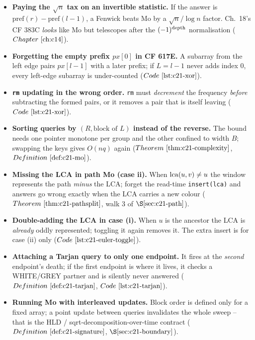 \begin{itemize}[nosep, leftmargin=1.4em]
  \item \textbf{Paying the \(\sqrt n\) tax on an invertible statistic.} If the
        answer is \(\mathrm{pref}(r)-\mathrm{pref}(l-1)\), a Fenwick beats Mo by a
        \(\sqrt n/\log n\) factor.  Ch.~18's CF 383C \emph{looks} like Mo but telescopes
        after the \((-1)^{\operatorname{depth}}\) normalisation (\(\chref{c14}\)).
  \item \textbf{Forgetting the empty prefix \(px[0]\) in CF 617E.} A subarray from
        the left edge pairs \(px[l-1]\) with a later prefix; if \(L=l-1\) never
        adds index \(0\), every left-edge subarray is under-counted
        (\(\coderef{c21-xor}\)).
  \item \textbf{\texttt{rm} updating in the wrong order.} \texttt{rm} must
        \emph{decrement} the frequency \emph{before} subtracting the formed pairs,
        or it removes a pair that is itself leaving (\(\coderef{c21-xor}\)).
  \item \textbf{Sorting queries by \((R,\text{block of }L)\) instead of the reverse.}
        The bound needs one pointer monotone per group and the other confined to
        width \(B\); swapping the keys gives \(O(nq)\) again
        (\(\thmref{c21-complexity}\), \(\defref{c21-mo}\)).
  \item \textbf{Missing the LCA in path Mo (case ii).} When \(\operatorname{lca}(u,v)\neq u\)
        the window represents the path \emph{minus} the LCA; forget the read-time
        \texttt{insert(lca)} and answers go wrong exactly when the LCA carries a
        new colour (\(\thmref{c21-pathsplit}\), walk 3 of \(\secref{c21-path}\)).
  \item \textbf{Double-adding the LCA in case (i).} When \(u\) is the ancestor the
        LCA is \emph{already} oddly represented; toggling it again removes it.
        The extra insert is for case (ii) only (\(\coderef{c21-euler-toggle}\)).
  \item \textbf{Attaching a Tarjan query to only one endpoint.} It fires at the
        \emph{second} endpoint's death; if the first endpoint is where it lives, it
        checks a WHITE/GREY partner and is silently never answered
        (\(\defref{c21-tarjan}\), \(\coderef{c21-tarjan}\)).
  \item \textbf{Running Mo with interleaved updates.} Block order is defined only
        for a fixed array; a point update between queries invalidates the whole
        sweep -- that is the HLD / sqrt-decomposition-over-time contract
        (\(\defref{c21-signature}\), \(\secref{c21-boundary}\)).
\end{itemize}

